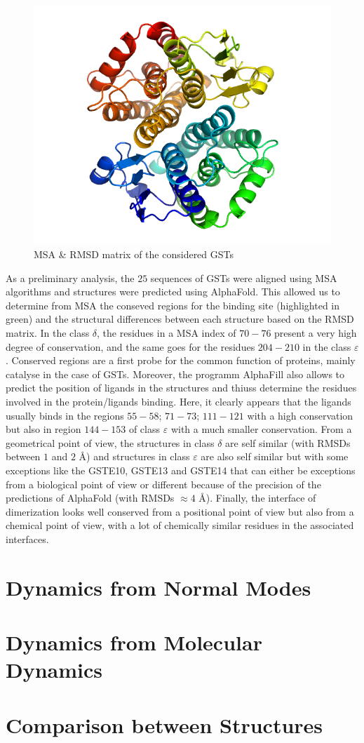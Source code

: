 \begin{figure}[h!]
\begin{minipage}{.32\linewidth}
		\includegraphics[width = .99\textwidth]{figures/fig3-1-4} %
	\end{minipage}
	\caption{MSA \& RMSD matrix of the considered GSTs}
\end{figure}
As a preliminary analysis, the $25$ sequences of GSTs were aligned using MSA algorithms and structures were predicted using AlphaFold. This allowed us to determine from MSA the conseved regions for the binding site (highlighted in green) and the structural differences between each structure based on the RMSD matrix. In the class $\delta$, the residues in a MSA index of $70-76$ present a very high degree of conservation, and the same goes for the residues $204-210$ in the class $\varepsilon$. Conserved regions are a first probe for the common function of proteins, mainly catalyse in the case of GSTs. Moreover, the programm AlphaFill also allows to predict the position of ligands in the structures and thiuss determine the residues involved in the protein/ligands binding. Here, it clearly appears that the ligands usually binds in the regions $55-58$; $71-73$; $111-121$ with a high conservation but also in region $144-153$ of class $\varepsilon$ with a much smaller conservation. From a geometrical point of view, the structures in class $\delta$ are self similar (with RMSDs between $1$ and $2$ \AA) and structures in class $\varepsilon$ are also self similar but with some exceptions like the GSTE10, GSTE13 and GSTE14 that can either be exceptions from a biological point of view or different because of the precision of the predictions of AlphaFold (with RMSDs $\approx 4$ \AA). Finally, the interface of dimerization looks well conserved from a positional point of view but also from a chemical point of view, with a lot of chemically similar residues in the associated interfaces.   
\section{Dynamics from Normal Modes}

\section{Dynamics from Molecular Dynamics}

\section{Comparison between Structures}